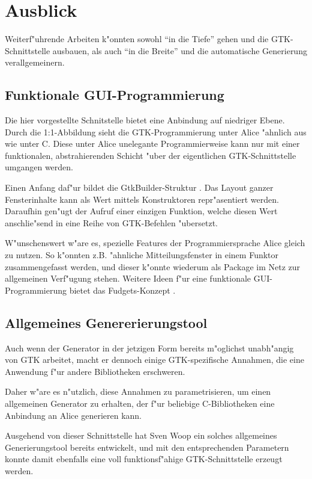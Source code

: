 \documentclass[a4paper,titlepage]{article}
\begin{document}
\section{Ausblick}

Weiterf"uhrende Arbeiten k"onnten sowohl ``in die Tiefe'' gehen und die
GTK-Schnittstelle ausbauen, als auch ``in die Breite'' und die automatische
Generierung verallgemeinern.

\subsection*{Funktionale GUI-Programmierung}

Die hier vorgestellte Schnitstelle bietet eine Anbindung auf niedriger Ebene.
Durch die 1:1-Abbildung sieht die GTK-Programmierung unter Alice "ahnlich
aus wie unter C. Diese unter Alice unelegante Programmierweise kann
nur mit einer funktionalen, abstrahierenden Schicht "uber der
eigentlichen GTK-Schnittstelle umgangen werden.

Einen Anfang daf"ur bildet die GtkBuilder-Struktur \cite{gtkbuilder}.
Das Layout ganzer Fensterinhalte kann als Wert mittels Konstruktoren
repr"asentiert werden. Daraufhin gen"ugt der Aufruf einer einzigen Funktion,
welche diesen Wert anschlie"send in eine Reihe von GTK-Befehlen "ubersetzt.

W"unschenswert w"are es, spezielle Features der Programmiersprache Alice
gleich zu nutzen. So k"onnten z.B. "ahnliche Mitteilungsfenster
in einem Funktor zusammengefasst werden, und dieser k"onnte wiederum als
Package im Netz zur allgemeinen Verf"ugung stehen. Weitere Ideen
f"ur eine funktionale GUI-Programmierung bietet das Fudgets-Konzept
\cite{fudgets}. 

\subsection*{Allgemeines Genererierungstool}

Auch wenn der Generator in der jetzigen Form bereits m"oglichst unabh"angig
von GTK arbeitet, macht er dennoch einige GTK-spezifische Annahmen, die
eine Anwendung f"ur andere Bibliotheken erschweren.

Daher w"are es n"utzlich, diese Annahmen zu parametrisieren, um einen
allgemeinen Generator zu erhalten, der f"ur beliebige C-Bibliotheken
eine Anbindung an Alice generieren kann. 

Ausgehend von dieser Schnittstelle hat Sven Woop ein solches allgemeines
Generierungstool bereits entwickelt,
und mit den entsprechenden Parametern konnte damit ebenfalls eine
voll funktionsf"ahige GTK-Schnittstelle erzeugt werden.
\end{document}
